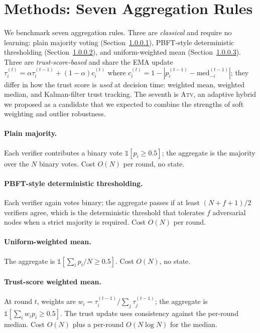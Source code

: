 \documentclass[11pt]{article}
\begin{document}
\section{Methods: Seven Aggregation Rules}
\label{sec:method}

We benchmark seven aggregation rules. Three are \emph{classical} and
require no learning: plain majority voting
(Section~\ref{sub:majority}), PBFT-style deterministic thresholding
(Section~\ref{sub:pbft}), and uniform-weighted mean
(Section~\ref{sub:uniform}). Three are \emph{trust-score-based} and
share the EMA update
$\tau_i^{(t)} = \alpha \tau_i^{(t-1)} + (1-\alpha) c_i^{(t)}$ where
$c_i^{(t)} = 1 - |p_i^{(t-1)} - \text{med}_{-i}^{(t-1)}|$; they differ
in how the trust score is \emph{used} at decision time: weighted mean,
weighted median, and Kalman-filter trust tracking. The seventh is
\textsc{Atv}, an adaptive hybrid we proposed as a candidate that we
expected to combine the strengths of soft weighting and outlier
robustness.

\paragraph{Plain majority.}
\label{sub:majority}
Each verifier contributes a binary vote $\mathbb{1}[p_i \geq 0.5]$; the
aggregate is the majority over the $N$ binary votes. Cost $O(N)$ per
round, no state.

\paragraph{PBFT-style deterministic thresholding.}
\label{sub:pbft}
\citep{castro1999pbft} Each verifier again votes binary; the aggregate
passes if at least $(N+f+1)/2$ verifiers agree, which is the
deterministic threshold that tolerates $f$ adversarial nodes when a
strict majority is required. Cost $O(N)$ per round.

\paragraph{Uniform-weighted mean.}
\label{sub:uniform}
The aggregate is $\mathbb{1}[\sum_i p_i / N \geq 0.5]$. Cost $O(N)$,
no state.

\paragraph{Trust-score weighted mean.}
\label{sub:trustmean}
At round $t$, weights are $w_i = \tau_i^{(t-1)} / \sum_j \tau_j^{(t-1)}$;
the aggregate is $\mathbb{1}[\sum_i w_i p_i \geq 0.5]$. The trust
update uses consistency against the per-round median. Cost $O(N)$
plus a per-round $O(N \log N)$ for the median.
\end{document}
